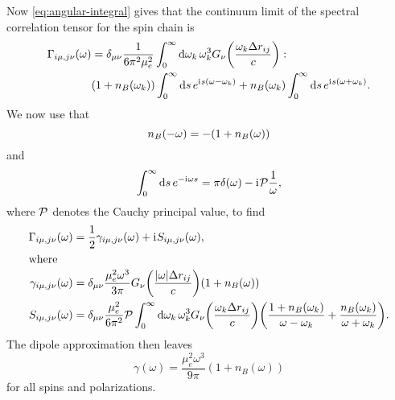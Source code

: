 \documentclass[../thesis.tex]{subfiles}
\begin{document}
Now \cref{eq:angular-integral} gives that the continuum limit of the spectral
correlation tensor for the spin chain is
\begin{align}
  \begin{split}
  \Gamma_{i\mu,j\nu}(\omega)
  &= \delta_{\mu\nu} \frac{1}{6\pi^2 \mu_e^2}
  \int_0^\infty \dd{\omega_k} \omega_k^3
  G_{\nu}\qty(\frac{\omega_k \Delta r_{ij}}{c})
  :
  \\
  &\qty(1 + n_B(\omega_k)) \int_0^\infty \dd{s} e^{\mathrm{i}\mkern1mu s(\omega - \omega_k)}
  + n_B(\omega_k) \int_0^\infty \dd{s} e^{\mathrm{i}\mkern1mu s(\omega + \omega_k)}.
  \end{split}
\end{align}
We now use that
\begin{equation}
  n_B(-\omega)
  = -\qty(1 + n_B(\omega))
\end{equation}
and 
\begin{equation}
  \int_0^\infty \dd{s} e^{-\im\omega s}
  = \pi\delta(\omega) - \im\pv\frac{1}{\omega},
\end{equation}
where $\pv$ denotes the Cauchy principal value, to find
\begin{align}
  \Gamma_{i\mu,j\nu}(\omega)
  &= \frac{1}{2}\gamma_{i\mu,j\nu}(\omega) + \im S_{i\mu,j\nu}(\omega),
  \\
  \shortintertext{where}
  \gamma_{i\mu,j\nu}(\omega)
  &= \delta_{\mu\nu} \frac{\mu_e^2 \omega^3}{3\pi}
  G_{\nu}\qty(\frac{\abs{\omega} \Delta r_{ij}}{c})
  (1 + n_B(\omega))
  \label{eq:gamma-full}
  \\
  S_{i\mu,j\nu}(\omega)
  &= \delta_{\mu\nu} \frac{\mu_e^2}{6\pi^2}
  \pv\int_0^\infty \dd{\omega_k} \omega_k^3
  G_{\nu}\qty(\frac{\omega_k \Delta r_{ij}}{c})
  \qty(\frac{1 + n_B(\omega_k)}{\omega - \omega_k}
  + \frac{n_B(\omega_k)}{\omega + \omega_k}).
  \label{eq:S-full}
\end{align}
The dipole approximation then leaves
\begin{equation}
  \gamma(\omega)
  = \frac{\mu_e^2 \omega^3}{9\pi}
  (1 + n_B(\omega))
  \label{eq:gamma-dipole}
\end{equation}
for all spins and polarizations.
\end{document}
